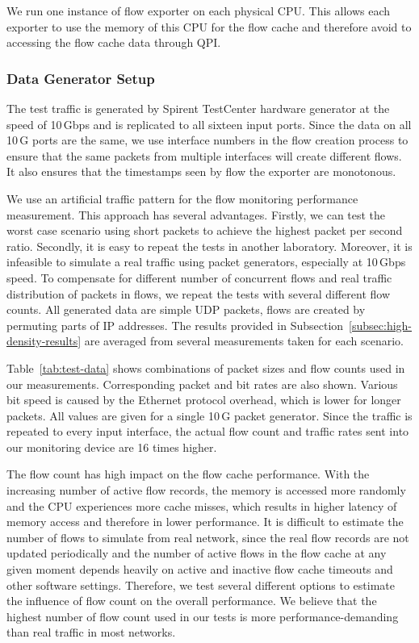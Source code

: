 We run one instance of flow exporter on each physical CPU. This allows each exporter to use the memory of this CPU for the flow cache and therefore avoid to accessing the flow cache data through QPI.

\subsubsection{Data Generator Setup}

The test traffic is generated by Spirent TestCenter hardware generator at the speed of 10\,Gbps and is replicated to all sixteen input ports. Since the data on all 10\,G ports are the same, we use interface numbers in the flow creation process to ensure that the same packets from multiple interfaces will create different flows. It also ensures that the timestamps seen by flow the exporter are monotonous.

We use an artificial traffic pattern for the flow monitoring performance measurement. This approach has several advantages. Firstly, we can test the worst case scenario using short packets to achieve the highest packet per second ratio. Secondly, it is easy to repeat the tests in another laboratory. Moreover, it is infeasible to simulate a real traffic using packet generators, especially at 10\,Gbps speed. To compensate for different number of concurrent flows and real traffic distribution of packets in flows, we repeat the tests with several different flow counts. All generated data are simple UDP packets, flows are created by permuting parts of IP addresses. The results provided in Subsection~\ref{subsec:high-density-results} are averaged from several measurements taken for each scenario.

Table~\ref{tab:test-data} shows combinations of packet sizes and flow counts used in our measurements. Corresponding packet and bit rates are also shown. Various bit speed is caused by the Ethernet protocol overhead, which is lower for longer packets. All values are given for a single 10\,G packet generator. Since the traffic is repeated to every input interface, the actual flow count and traffic rates sent into our monitoring device are 16 times higher.

The flow count has high impact on the flow cache performance. With the increasing number of active flow records, the memory is accessed more randomly and the CPU experiences more cache misses, which results in higher latency of memory access and therefore in lower performance. It is difficult to estimate the number of flows to simulate from real network, since the real flow records are not updated periodically and the number of active flows in the flow cache at any given moment depends heavily on active and inactive flow cache timeouts and other software settings. Therefore, we test several different options to estimate the influence of flow count on the overall performance. We believe that the highest number of flow count used in our tests is more performance-demanding than real traffic in most networks.

